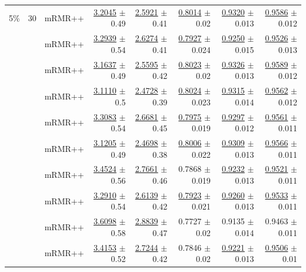 \begin{longtable}{llp{}rrrrr}
\midrule
5\% & 30 & mRMR++ & \underline{3.2045} {\scriptsize $\pm$ 0.49} & \underline{2.5921} {\scriptsize $\pm$ 0.41} & \underline{0.8014} {\scriptsize $\pm$ 0.02} & \underline{0.9320} {\scriptsize $\pm$ 0.013} & \underline{0.9586} {\scriptsize $\pm$ 0.012} \\
 &  & mRMR++ & \underline{3.2939} {\scriptsize $\pm$ 0.54} & \underline{2.6274} {\scriptsize $\pm$ 0.41} & \underline{0.7927} {\scriptsize $\pm$ 0.024} & \underline{0.9250} {\scriptsize $\pm$ 0.015} & \underline{0.9526} {\scriptsize $\pm$ 0.013} \\
 &  & mRMR++ & \underline{3.1637} {\scriptsize $\pm$ 0.49} & \underline{2.5595} {\scriptsize $\pm$ 0.42} & \underline{0.8023} {\scriptsize $\pm$ 0.02} & \underline{0.9326} {\scriptsize $\pm$ 0.013} & \underline{0.9589} {\scriptsize $\pm$ 0.012} \\
 &  & mRMR++ & \underline{3.1110} {\scriptsize $\pm$ 0.5} & \underline{2.4728} {\scriptsize $\pm$ 0.39} & \underline{0.8024} {\scriptsize $\pm$ 0.023} & \underline{0.9315} {\scriptsize $\pm$ 0.014} & \underline{0.9562} {\scriptsize $\pm$ 0.012} \\
 &  & mRMR++ & \underline{3.3083} {\scriptsize $\pm$ 0.54} & \underline{2.6681} {\scriptsize $\pm$ 0.45} & \underline{0.7975} {\scriptsize $\pm$ 0.019} & \underline{0.9297} {\scriptsize $\pm$ 0.012} & \underline{0.9561} {\scriptsize $\pm$ 0.011} \\
 &  & mRMR++ & \underline{3.1205} {\scriptsize $\pm$ 0.49} & \underline{2.4698} {\scriptsize $\pm$ 0.38} & \underline{0.8006} {\scriptsize $\pm$ 0.022} & \underline{0.9309} {\scriptsize $\pm$ 0.013} & \underline{0.9566} {\scriptsize $\pm$ 0.011} \\
 &  & mRMR++ & \underline{3.4524} {\scriptsize $\pm$ 0.56} & \underline{2.7661} {\scriptsize $\pm$ 0.46} & 0.7868 {\scriptsize $\pm$ 0.019} & \underline{0.9232} {\scriptsize $\pm$ 0.013} & \underline{0.9521} {\scriptsize $\pm$ 0.011} \\
 &  & mRMR++ & \underline{3.2910} {\scriptsize $\pm$ 0.54} & \underline{2.6139} {\scriptsize $\pm$ 0.42} & \underline{0.7923} {\scriptsize $\pm$ 0.021} & \underline{0.9260} {\scriptsize $\pm$ 0.013} & \underline{0.9533} {\scriptsize $\pm$ 0.011} \\
 &  & mRMR++ & \underline{3.6098} {\scriptsize $\pm$ 0.58} & \underline{2.8839} {\scriptsize $\pm$ 0.47} & 0.7727 {\scriptsize $\pm$ 0.02} & 0.9135 {\scriptsize $\pm$ 0.014} & 0.9463 {\scriptsize $\pm$ 0.011} \\
 &  & mRMR++ & \underline{3.4153} {\scriptsize $\pm$ 0.52} & \underline{2.7244} {\scriptsize $\pm$ 0.42} & 0.7846 {\scriptsize $\pm$ 0.02} & \underline{0.9221} {\scriptsize $\pm$ 0.013} & \underline{0.9506} {\scriptsize $\pm$ 0.01} \\

\end{longtable}
